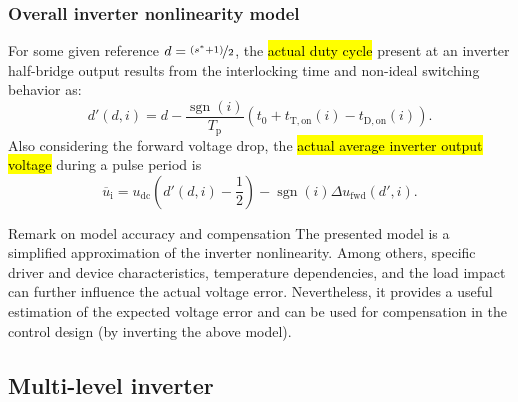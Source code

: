 \begin{frame}
    \frametitle{Overall inverter nonlinearity model}
    For some given reference $d=\nicefrac{(s^*+1)}{2}$, the \hl{actual duty cycle} present at an inverter half-bridge output results from the interlocking time and non-ideal switching behavior as:
    \begin{equation}
        d'(d,i) = d - \frac{\operatorname{sgn}(i)}{T_\mathrm{p}}\left(t_0+t_\mathrm{T,on}(i)-t_\mathrm{D,on}(i)\right).
    \end{equation}\pause
    Also considering the forward voltage drop, the \hl{actual average inverter output voltage} during a pulse period is
    \begin{equation}
        \overline{u}_\mathrm{i} = u_\mathrm{dc}\left(d'(d,i) - \frac{1}{2}\right) - \operatorname{sgn}(i)\Delta u_\mathrm{fwd}(d',i).
    \end{equation}\pause\vspace{-0.25cm}
    \begin{varblock}{Remark on model accuracy and compensation}
        The presented model is a simplified approximation of the inverter nonlinearity. Among others, specific driver and device characteristics, temperature dependencies, and the load impact can further influence the actual voltage error. Nevertheless, it provides a useful estimation of the expected voltage error and can be used for compensation in the control design (by inverting the above model).
    \end{varblock}
\end{frame}


\subsection{Multi-level inverter}

